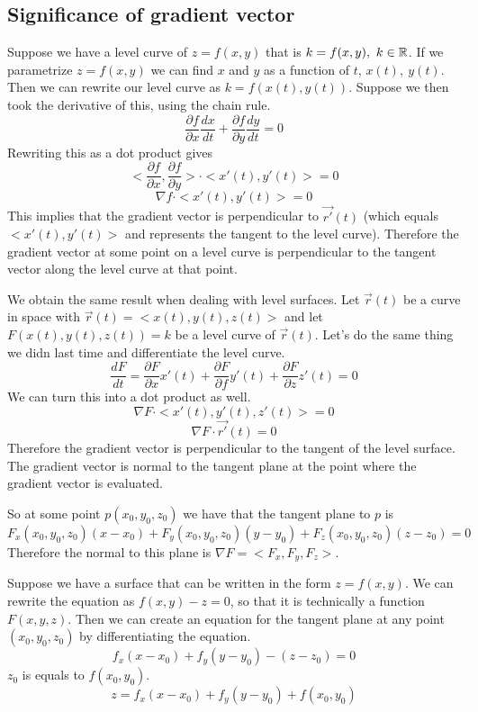 \documentclass[12 pt]{article}
\begin{document}
        \subsection{Significance of gradient vector}

        Suppose we have a level curve of $z=f(x,y)$ that is $k=f(x,y),\ k\in\mathbb{R}$. If we parametrize $z=f(x,y)$ we can find $x$ and $y$ as a function of $t$, $x(t),\ y(t)$. Then we can rewrite our level curve as $k=f(x(t),y(t))$. Suppose we then took the derivative of this, using the chain rule.
        $$\frac{\partial f}{\partial x}\frac{dx}{dt}+\frac{\partial f}{\partial y}\frac{dy}{dt}=0$$
        Rewriting this as a dot product gives
        $$<\frac{\partial f}{\partial x},\frac{\partial f}{\partial y}>\cdot<x'(t),y'(t)>=0$$
        $$\nabla f\cdot<x'(t),y'(t)>=0$$
        This implies that the gradient vector is perpendicular to $\vec{r'}(t)$ (which equals $<x'(t),y'(t)>$ and represents the tangent to the level curve). Therefore the gradient vector at some point on a level curve is perpendicular to the tangent vector along the level curve at that point.

        We obtain the same result when dealing with level surfaces. Let $\vec{r}(t)$ be a curve in space with $\vec{r}(t)=<x(t),y(t),z(t)>$ and let $F(x(t),y(t),z(t))=k$ be a level curve of $\vec{r}(t)$. Let's do the same thing we didn last time and differentiate the level curve.
        $$\frac{dF}{dt}=\frac{\partial F}{\partial x}x'(t)+\frac{\partial F}{\partial f}y'(t)+\frac{\partial F}{\partial z}z'(t)=0$$
        We can turn this into a dot product as well.
        $$\nabla F\cdot <x'(t),y'(t),z'(t)>=0$$
        $$\nabla F\cdot \vec{r'}(t)=0$$
        Therefore the gradient vector is perpendicular to the tangent of the level surface. The gradient vector is normal to the tangent plane at the point where the gradient vector is evaluated.

        So at some point $p(x_0,y_0,z_0)$ we have that the tangent plane to $p$ is
        $$F_x(x_0,y_0,z_0)(x-x_0)+F_y(x_0,y_0,z_0)(y-y_0)+F_z(x_0,y_0,z_0)(z-z_0)=0$$
        Therefore the normal to this plane is $\nabla F=<F_x,F_y,F_z>$.

        Suppose we have a surface that can be written in the form $z=f(x,y)$. We can rewrite the equation as $f(x,y)-z=0$, so that it is technically a function $F(x,y,z)$. Then we can create an equation for the tangent plane at any point $(x_0,y_0,z_0)$ by differentiating the equation.
        $$f_x(x-x_0)+f_y(y-y_0)-(z-z_0)=0$$
        $z_0$ is equals to $f(x_0,y_0)$.
        $$z=f_x(x-x_0)+f_y(y-y_0)+f(x_0,y_0)$$
\end{document}
